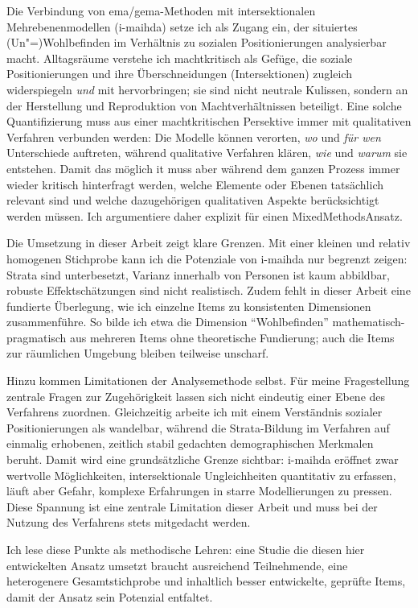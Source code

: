 Die Verbindung von \gls{ema}/\gls{gema}-Methoden mit intersektionalen Mehrebenenmodellen (\gls{i-maihda}) setze ich als Zugang ein, der situiertes (Un\nobreakdash"=)Wohlbefinden im Verhältnis zu sozialen Positionierungen analysierbar macht. Alltagsräume verstehe ich machtkritisch als Gefüge, die soziale Positionierungen und ihre Überschneidungen (Intersektionen) zugleich widerspiegeln \emph{und} mit hervorbringen; sie sind nicht neutrale Kulissen, sondern an der Herstellung und Reproduktion von Machtverhältnissen beteiligt. 
Eine solche Quantifizierung muss aus einer machtkritischen Persektive immer mit qualitativen Verfahren verbunden werden: Die Modelle können verorten, \emph{wo} und \emph{für wen} Unterschiede auftreten, während qualitative Verfahren klären, \emph{wie} und \emph{warum} sie entstehen. Damit das möglich it muss aber während dem ganzen Prozess immer wieder kritisch hinterfragt werden, welche Elemente oder Ebenen tatsächlich relevant sind und welche dazugehörigen qualitativen Aspekte berücksichtigt werden müssen. Ich argumentiere daher explizit für einen Mixed\-Methods\-Ansatz.

Die Umsetzung in dieser Arbeit zeigt klare Grenzen. Mit einer kleinen und relativ homogenen Stichprobe kann ich die Potenziale von \gls{i-maihda} nur begrenzt zeigen: Strata sind unterbesetzt, Varianz innerhalb von Personen ist kaum abbildbar, robuste Effektschätzungen sind nicht realistisch. Zudem fehlt in dieser Arbeit eine fundierte Überlegung, wie ich einzelne Items zu konsistenten Dimensionen zusammenführe. So bilde ich etwa die Dimension \enquote{Wohlbefinden} mathematisch-pragmatisch aus mehreren Items ohne theoretische Fundierung; auch die Items zur räumlichen Umgebung bleiben teilweise unscharf.

Hinzu kommen Limitationen der Analysemethode selbst. Für meine Fragestellung zentrale Fragen zur Zugehörigkeit lassen sich nicht eindeutig einer Ebene des Verfahrens zuordnen. Gleichzeitig arbeite ich mit einem Verständnis sozialer Positionierungen als wandelbar, während die Strata-Bildung im Verfahren auf einmalig erhobenen, zeitlich stabil gedachten demographischen Merkmalen beruht. Damit wird eine grundsätzliche Grenze sichtbar: \gls{i-maihda} eröffnet zwar wertvolle Möglichkeiten, intersektionale Ungleichheiten quantitativ zu erfassen, läuft aber Gefahr, komplexe Erfahrungen in starre Modellierungen zu pressen. Diese Spannung ist eine zentrale Limitation dieser Arbeit und muss bei der Nutzung des Verfahrens stets mitgedacht werden.

Ich lese diese Punkte als methodische Lehren: eine Studie die diesen hier entwickelten Ansatz umsetzt braucht ausreichend Teilnehmende, eine heterogenere Gesamtstichprobe und inhaltlich besser entwickelte, geprüfte Items, damit der Ansatz sein Potenzial entfaltet.


